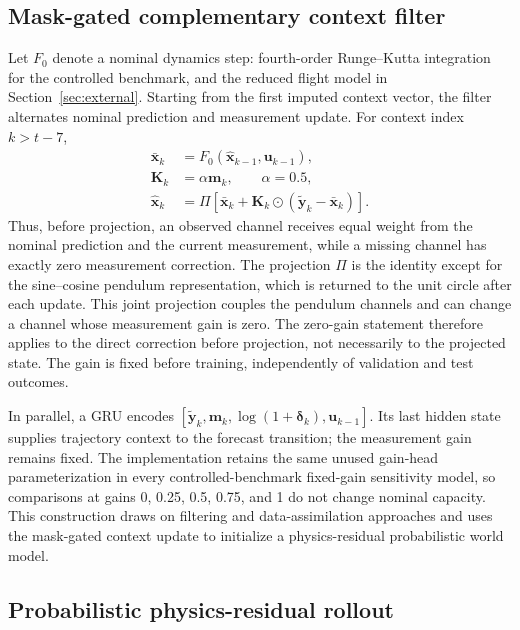 \documentclass[pdflatex,sn-basic]{sn-jnl}
\newcommand{\vect}[1]{\mathbf{#1}}
\begin{document}
\subsection{Mask-gated complementary context filter}

Let $F_0$ denote a nominal dynamics step: fourth-order Runge--Kutta integration
for the controlled benchmark, and the reduced flight model in
Section~\ref{sec:external}. Starting from the first imputed context vector, the
filter alternates nominal prediction and measurement update. For context index
$k>t-7$,
\begin{align}
 \bar{\vect x}_{k} &= F_0(\hat{\vect x}_{k-1},\vect u_{k-1}),\\
 \vect K_k &= \alpha\vect m_k,\qquad \alpha=0.5,\\
 \hat{\vect x}_k &= \Pi\!\left[
 \bar{\vect x}_k+\vect K_k\odot
 (\tilde{\vect y}_k-\bar{\vect x}_k)\right].
 \label{eq:complementary-update}
\end{align}
Thus, before projection, an observed channel receives equal weight from the
nominal prediction and the current measurement, while a missing channel has
exactly zero measurement correction. The projection $\Pi$ is the identity
except for the sine--cosine pendulum representation, which is returned to the
unit circle after each update. This joint projection couples the pendulum
channels and can change a channel whose measurement gain is zero. The zero-gain
statement therefore applies to the direct correction before projection, not
necessarily to the projected state. The gain is
fixed before training, independently of validation and test outcomes.

In parallel, a GRU encodes
$[\tilde{\vect y}_k,\vect m_k,\log(1+\boldsymbol\delta_k),\vect u_{k-1}]$.
Its last hidden state supplies trajectory context to the forecast transition;
the measurement gain remains fixed. The implementation retains the
same unused gain-head parameterization in every controlled-benchmark
fixed-gain sensitivity model,
so comparisons at gains 0, 0.25, 0.5, 0.75, and 1 do not change nominal
capacity. This construction draws on filtering and data-assimilation approaches
\citep{revach2022_kalmannet,cheng2023_machine_learning_with_data_assimilation}
and uses the mask-gated context update to initialize a physics-residual
probabilistic world model.

\subsection{Probabilistic physics-residual rollout}
\end{document}
